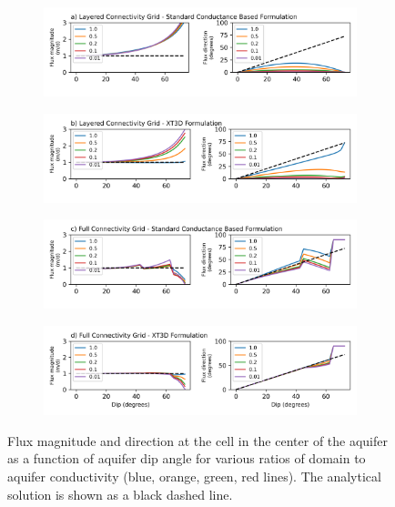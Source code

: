 \documentclass{article}
\begin{document}
\begin{figure}[p!]
\centering
\begin{subfigure}{0.9\textwidth}
	\includegraphics[width=\textwidth]{../figures/fig4_0_paper.png}
\end{subfigure}
\begin{subfigure}{0.9\textwidth}
	\includegraphics[width=\textwidth]{../figures/fig4_1_paper.png}
\end{subfigure}
\begin{subfigure}{0.9\textwidth}
	\includegraphics[width=\textwidth]{../figures/fig4_2_paper.png}
\end{subfigure}
\begin{subfigure}{0.9\textwidth}
	\includegraphics[width=\textwidth]{../figures/fig4_3_paper.png}
\end{subfigure}

\caption{Flux magnitude and direction at the cell in the center of the aquifer as a function of aquifer dip angle for various ratios of domain to aquifer conductivity (blue, orange, green, red lines). The analytical solution is shown as a black dashed line.}
\label{fig:fig4}
\end{figure}
\end{document}
